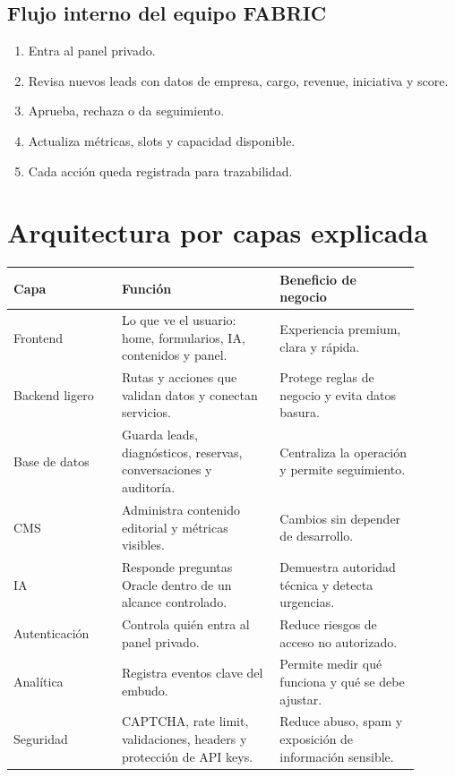 \documentclass[11pt,letterpaper]{article}
\begin{document}
\subsection{Flujo interno del equipo FABRIC}

\begin{enumerate}
\item Entra al panel privado.
\item Revisa nuevos leads con datos de empresa, cargo, revenue, iniciativa y score.
\item Aprueba, rechaza o da seguimiento.
\item Actualiza m\'etricas, slots y capacidad disponible.
\item Cada acci\'on queda registrada para trazabilidad.
\end{enumerate}

\section{Arquitectura por capas explicada}

\begin{longtable}{p{0.24\linewidth}p{0.35\linewidth}p{0.31\linewidth}}
\toprule
\textbf{Capa} & \textbf{Funci\'on} & \textbf{Beneficio de negocio} \\
\midrule
Frontend & Lo que ve el usuario: home, formularios, IA, contenidos y panel. & Experiencia premium, clara y r\'apida. \\
Backend ligero & Rutas y acciones que validan datos y conectan servicios. & Protege reglas de negocio y evita datos basura. \\
Base de datos & Guarda leads, diagn\'osticos, reservas, conversaciones y auditor\'ia. & Centraliza la operaci\'on y permite seguimiento. \\
CMS & Administra contenido editorial y m\'etricas visibles. & Cambios sin depender de desarrollo. \\
IA & Responde preguntas Oracle dentro de un alcance controlado. & Demuestra autoridad t\'ecnica y detecta urgencias. \\
Autenticaci\'on & Controla qui\'en entra al panel privado. & Reduce riesgos de acceso no autorizado. \\
Anal\'itica & Registra eventos clave del embudo. & Permite medir qu\'e funciona y qu\'e se debe ajustar. \\
Seguridad & CAPTCHA, rate limit, validaciones, headers y protecci\'on de API keys. & Reduce abuso, spam y exposici\'on de informaci\'on sensible. \\
\bottomrule
\end{longtable}
\end{document}
